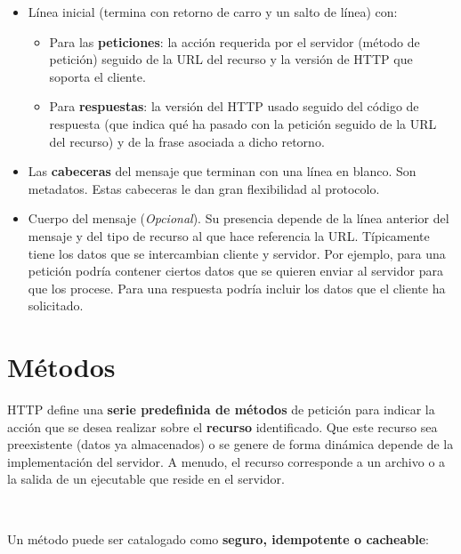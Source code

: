 \documentclass[a4paper,10pt]{article}
\begin{document}
\begin{itemize}
    
    \item Línea inicial (termina con retorno de carro y un salto de línea) con:
    
    \begin{itemize}
        \item[*] Para las \textbf{peticiones}: la acción requerida por el servidor (método de petición) 
        seguido de la URL del recurso y la versión de HTTP que soporta el cliente.
        
        \item[*] Para \textbf{respuestas}: la versión del HTTP usado seguido del código de respuesta 
        (que indica qué ha pasado con la petición seguido de la URL del recurso) y de la frase asociada a dicho retorno.
    
    \end{itemize}
    
    \item Las \textbf{cabeceras} del mensaje que terminan con una línea en blanco. Son metadatos. Estas cabeceras le dan gran flexibilidad al protocolo.
    
    \item Cuerpo del mensaje (\textit{Opcional}). Su presencia depende de la línea anterior del mensaje y del tipo de recurso al que hace referencia la URL. 
    Típicamente tiene los datos que se intercambian cliente y servidor. 
    Por ejemplo, para una petición podría contener ciertos datos que se quieren enviar al servidor para que los procese. Para una respuesta podría incluir los datos que el cliente ha solicitado.

\end{itemize}




\section{Métodos}

HTTP define una \textbf{serie predefinida de métodos} de petición para indicar la acción que se desea realizar sobre el \textbf{recurso} identificado. 
Que este recurso sea preexistente (datos ya almacenados) o se genere de forma dinámica depende de la implementación del servidor. 
A menudo, el recurso corresponde a un archivo o a la salida de un ejecutable que reside en el servidor.

\

Un método puede ser catalogado como \textbf{seguro, idempotente o cacheable}:
\end{document}
